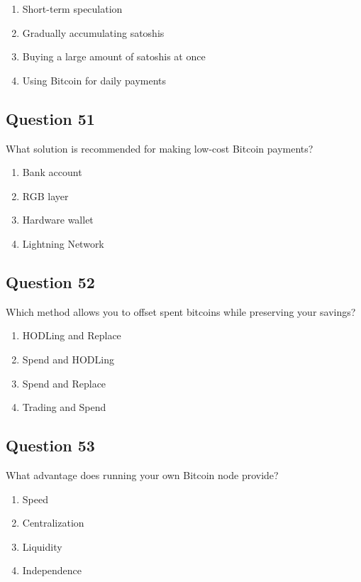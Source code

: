 \documentclass[12pt,a4paper]{article}
\begin{document}
\begin{enumerate}[label=\Alph*., leftmargin=*]
\item Short-term speculation
\item Gradually accumulating satoshis
\item Buying a large amount of satoshis at once
\item Using Bitcoin for daily payments
\end{enumerate}

\bigskip


\subsection*{Question 51}
What solution is recommended for making low-cost Bitcoin payments?

\begin{enumerate}[label=\Alph*., leftmargin=*]
\item Bank account
\item RGB layer
\item Hardware wallet
\item Lightning Network
\end{enumerate}

\bigskip


\subsection*{Question 52}
Which method allows you to offset spent bitcoins while preserving your savings?

\begin{enumerate}[label=\Alph*., leftmargin=*]
\item HODLing and Replace
\item Spend and HODLing
\item Spend and Replace
\item Trading and Spend
\end{enumerate}

\bigskip


\subsection*{Question 53}
What advantage does running your own Bitcoin node provide?

\begin{enumerate}[label=\Alph*., leftmargin=*]
\item Speed
\item Centralization
\item Liquidity
\item Independence
\end{enumerate}
\end{document}
